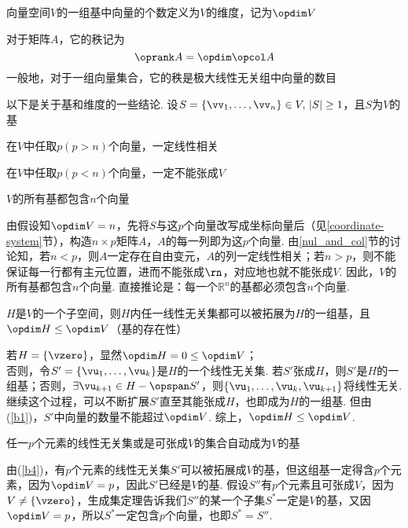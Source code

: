 \begin{definition}[维度]
向量空间$V$的一组基中向量的个数定义为$V$的维度，记为$\opdim V$
\end{definition}
\begin{definition}[秩]
对于矩阵$A$，它的秩记为
\[\oprank A=\opdim \opcol A\]
一般地，对于一组向量集合，它的秩是极大线性无关组中向量的数目
\end{definition}
\begin{theorem}以下是关于基和维度的一些结论. 设$S=\{\vv_1,\dots,\vv_n\}\in V,\,|S|\geq 1$，且$S$为$V$的基
\label{basis_theo}
\begin{partlist}
	\item \label{b1}在$V$中任取$p(p>n)$个向量，一定线性相关 %
	\item 在$V$中任取$p(p<n)$个向量，一定不能张成$V$%
	\item $V$的所有基都包含$n$个向量
	\begin{analysis}
	由假设知$\opdim V=n$，先将$S$与这$p$个向量改写成坐标向量后（见\ref{coordinate-system}节），构造$n\times p$矩阵$A$，$A$的每一列即为这$p$个向量. 由\ref{nul_and_col}节的讨论知，若$n<p$，则$A$一定存在自由变元，$A$的列一定线性相关；若$n>p$，则不能保证每一行都有主元位置，进而不能张成$\rn$，对应地也就不能张成$V$. 因此，$V$的所有基都包含$n$个向量.
	直接推论是：每一个$\mathbb{R}^n$的基都必须包含$n$个向量.
	\end{analysis}
	\item \label{b4}$H$是$V$的一个子空间，则$H$内任一线性无关集都可以被拓展为$H$的一组基，且$\opdim H\leq\opdim V$（基的存在性）
	\begin{analysis}
	若$H=\{\vzero\}$，显然$\opdim H=0\leq\opdim V$；\\
	否则，令$S'=\{\vu_1,\dots,\vu_k\}$是$H$的一个线性无关集. 若$S'$张成$H$，则$S'$是$H$的一组基；否则，$\exists\vu_{k+1}\in H-\opspan S'$，则$\{\vu_1,\dots,\vu_k,\vu_{k+1}\}$将线性无关. 继续这个过程，可以不断扩展$S'$直至其能张成$H$，也即成为$H$的一组基. 但由(\ref{b1})，$S'$中向量的数量不能超过$\opdim V$. 综上，$\opdim H\leq\opdim V$.
	\end{analysis}
	\item \label{b5}任一$p$个元素的线性无关集或是可张成$V$的集合自动成为$V$的基
	\begin{analysis}
	由(\ref{b4})，有$p$个元素的线性无关集$S'$可以被拓展成$V$的基，但这组基一定得含$p$个元素，因为$\opdim V=p$，因此$S'$已经是$V$的基. 假设$S''$有$p$个元素且可张成$V$，因为$V\ne\{\vzero\}$，生成集定理告诉我们$S''$的某一个子集$S^*$一定是$V$的基，又因$\opdim V=p$，所以$S^*$一定包含$p$个向量，也即$S^*=S''$.

\end{analysis}
\end{partlist}
\end{theorem}
